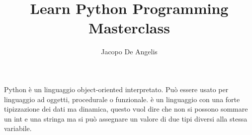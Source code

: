 \documentclass[11pt,a4paper]{book}
\begin{document}
\title{Learn Python Programming Masterclass}
\author{Jacopo De Angelis}
\maketitle

\pagebreak
\tableofcontents
\pagebreak

Python è un linguaggio object-oriented interpretato. Può essere usato per linguaggio ad oggetti, procedurale o funzionale.
è un linguaggio con una forte tipizzazione dei dati ma dinamica, questo vuol dire che non si possono sommare un int e una stringa ma si può assegnare un valore di due tipi diversi alla stessa variabile.
\end{document}
